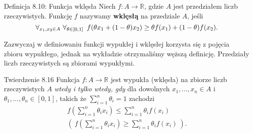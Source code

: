 \documentclass{article}
\newcommand{\hquad}{\mkern9mu}
\newcommand{\R}{\mathbb{R}}
\begin{document}
\begin{defr}{Definicja 8.10: Funkcja wklęsła}
    Niech $f:A\to\R$, gdzie $A$ jest przedziałem liczb rzeczywistych. Funkcję $f$ nazywamy \textbf{wklęsłą} na przedziale $A$, jeśli 
    \begin{equation*}
        \forall_{x_1,x_2\in A}\ \forall_{\theta\in[0,1]}\hquad f(\theta x_1+(1-\theta)x_2)\ge\theta f(x_1)+(1-\theta)f(x_2).
    \end{equation*}
\end{defr}

Zazwyczaj w definiowaniu funkcji wypukłej i wklęsłej korzysta się z pojęcia zbioru wypukłego, jednak na wykładzie otrzymaliśmy węższą definicję. Przedziały liczb rzeczywistych są zbiorami wypukłymi.

\begin{twier}{Twierdzenie 8.16}
    Funkcja $f:A\to\R$ jest wypukła (wklęsła) na zbiorze liczb rzeczywistych $A$ \textit{wtedy i tylko wtedy, gdy} dla dowolnych $x_1,\dots,x_n\in A$ i $\theta_1,\dots,\theta_n\in[0,1]$, takich że $\sum_{i=1}^{n}{\theta_{i}=1}$ zachodzi
    \begin{gather*}
        f\left(\sum_{i=1}^{n}{\theta_{i}x_{i}}\right)\le\sum_{i=1}^{n}{\theta_{i}f(x_{i})}\\
        \left(\ f\left(\sum_{i=1}^{n}{\theta_{i}x_{i}}\right)\ge\sum_{i=1}^{n}{\theta_{i}f(x_{i})}\ \right).
    \end{gather*}
\end{twier}
\end{document}
